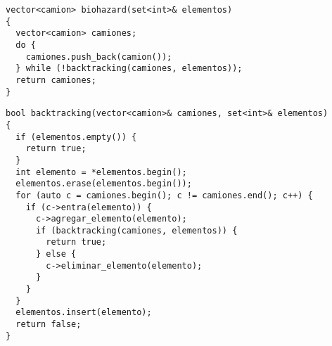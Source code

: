 \documentclass[a4paper]{article}
\begin{document}
\vspace*{0.5cm}

\begin{lstlisting}
vector<camion> biohazard(set<int>& elementos)
{
  vector<camion> camiones;
  do {
    camiones.push_back(camion());
  } while (!backtracking(camiones, elementos));
  return camiones;
}
\end{lstlisting}

\newpage

\begin{lstlisting}
bool backtracking(vector<camion>& camiones, set<int>& elementos)
{
  if (elementos.empty()) {
    return true;
  }
  int elemento = *elementos.begin();
  elementos.erase(elementos.begin());
  for (auto c = camiones.begin(); c != camiones.end(); c++) {
    if (c->entra(elemento)) {
      c->agregar_elemento(elemento);
      if (backtracking(camiones, elementos)) {
        return true;
      } else {
        c->eliminar_elemento(elemento);
      }
    }
  }
  elementos.insert(elemento);
  return false;
}
\end{lstlisting}
\end{document}
